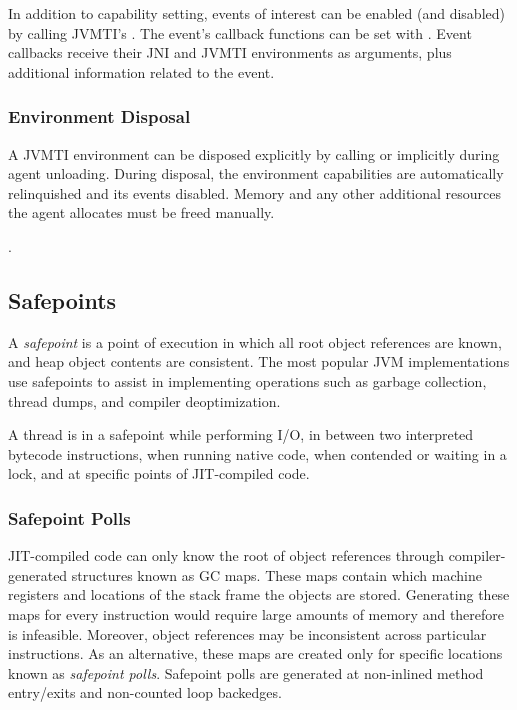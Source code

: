 In addition to capability setting, events of interest can be enabled (and disabled) by calling JVMTI's . The event's callback functions can be set with . Event callbacks receive their JNI and JVMTI environments as arguments, plus additional information related to the event.

\subsubsection*{Environment Disposal}

A JVMTI environment can be disposed explicitly by calling  or implicitly during agent unloading. During disposal, the environment capabilities are automatically relinquished and its events disabled. Memory and any other additional resources the agent allocates must be freed manually.

.

\subsection{Safepoints}

A \emph{safepoint} is a point of execution in which all root object references are known, and heap object contents are consistent. The most popular JVM implementations use safepoints to assist in implementing operations such as garbage collection, thread dumps, and compiler deoptimization.

A thread is in a safepoint while performing I/O, in between two interpreted bytecode instructions, when running native code, when contended or waiting in a lock, and at specific points of JIT-compiled code.

\subsubsection*{Safepoint Polls}

JIT-compiled code can only know the root of object references through compiler-generated structures known as GC maps. These maps contain which machine registers and locations of the stack frame the objects are stored. Generating these maps for every instruction would require large amounts of memory and therefore is infeasible. Moreover, object references may be inconsistent across particular instructions. As an alternative, these maps are created only for specific locations known as \emph{safepoint polls}. Safepoint polls are generated at non-inlined method entry/exits and non-counted loop backedges.

